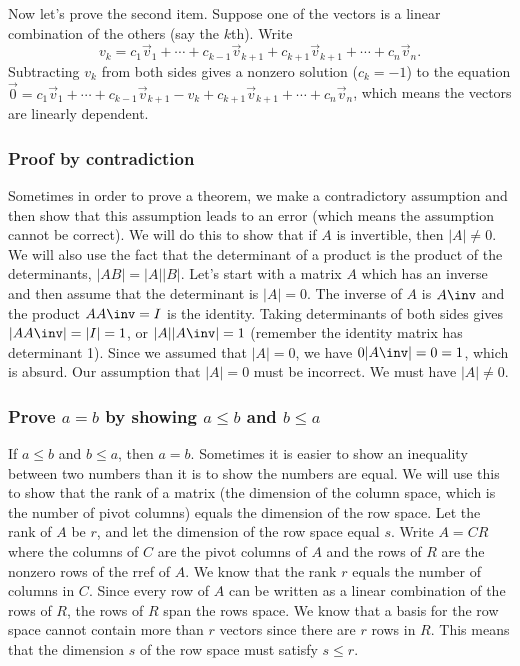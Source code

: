 Now let's prove the second item. Suppose one of the vectors is a linear combination of the others (say the $k$th). 
Write 
$$v_k=c_1\vec v_1+\cdots+c_{k-1}\vec v_{k+1}+c_{k+1}\vec v_{k+1}+\cdots+c_n\vec v_n.$$  
Subtracting $v_k$ from both sides gives a nonzero solution ($c_k=-1$) to the equation $\vec 0=c_1\vec v_1+\cdots+c_{k-1}\vec v_{k+1}-v_k+c_{k+1}\vec v_{k+1}+\cdots+c_n\vec v_n$, which means the vectors are linearly dependent.

\subsubsection{Proof by contradiction}
Sometimes in order to prove a theorem, we make a contradictory assumption and then show that this assumption leads to an error (which means the assumption cannot be correct).  
We will do this to show that if $A$ is invertible, then $|A|\neq 0$. 
We will also use the fact that the determinant of a product is the product of the determinants, $|AB|=|A||B|$.
Let's start with a matrix $A$ which has an inverse and then assume that the determinant is $|A|=0$.  
The inverse of $A$ is $A\inv$ and the product $AA\inv=I$ is the identity. 
Taking determinants of both sides gives $|AA\inv|=|I|=1$, or $|A||A\inv|=1$ (remember the identity matrix has determinant 1).  
Since we assumed that $|A|=0$, we have $0|A\inv|=0=1$, which is absurd. 
Our assumption that $|A|=0$ must be incorrect. 
We must have $|A|\neq 0$.    

\subsubsection{Prove $a=b$ by showing $a\leq b$ and $b\leq a$}
If $a\leq b$ and $b\leq a$, then $a=b$. 
Sometimes it is easier to show an inequality between two numbers than it is to show the numbers are equal.  
We will use this to show that the rank of a matrix (the dimension of the column space, which is the number of pivot columns) equals the dimension of the row space.
Let the rank of $A$ be $r$, and let the dimension of the row space equal $s$. 
Write $A=CR$ where the columns of $C$ are the pivot columns of $A$ and the rows of $R$ are the nonzero rows of the rref of $A$. 
We know that the rank $r$ equals the number of columns in $C$. 
Since every row of $A$ can be written as a linear combination of the rows of $R$, the rows of $R$ span the rows space. 
We know that a basis for the row space cannot contain more than $r$ vectors since there are $r$ rows in $R$. 
This means that the dimension $s$ of the row space must satisfy $s\leq r$.
 
